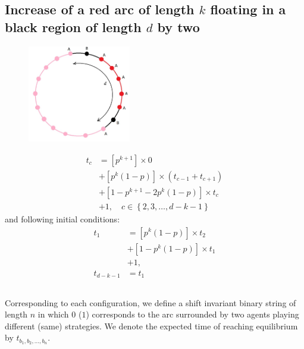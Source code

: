 \documentclass[]{book}
\theoremstyle{definition}
\begin{document}
\subsection{Increase of a red arc of length $k$ floating in a black region of length $d$ by two}
\begin{figure}[H]
    \centering\includegraphics[width=0.4\textwidth]{figures/arc increase.jpg}
    \caption{}
\end{figure}

\begin{equation}
\begin{split}
    t_c &= \left[p^{k+1} \right] \times 0 \\
    &+ \left[ p^k\left( 1-p \right) \right] \times \left( t_{c-1} + t_{c+1} \right) \\
    &+ \left[1 - p^{k+1} - 2p^k\left( 1-p \right) \right] \times t_c \\
    &+ 1, \quad c \in \left\{ 2, 3, \hdots, d - k - 1 \right\}
\end{split}
\end{equation}
and following initial conditions:
\begin{equation}
\begin{split}
    t_1 &= \left[p^k\left( 1-p \right) \right] \times t_2 \\
    &+ \left[ 1 - p^k\left( 1-p \right) \right] \times t_1 \\
    &+ 1, \\
    t_{d-k-1} &= t_1
\end{split}
\end{equation}


\newpage

\subsection{}
Corresponding to each configuration, we define a shift invariant binary string of length $n$ in which $0$ ($1$) corresponds to the arc surrounded by two agents playing different (same)  strategies. We denote the expected time of reaching equilibrium by $t_{b_1, b_2, \hdots, b_n}$.
\end{document}
